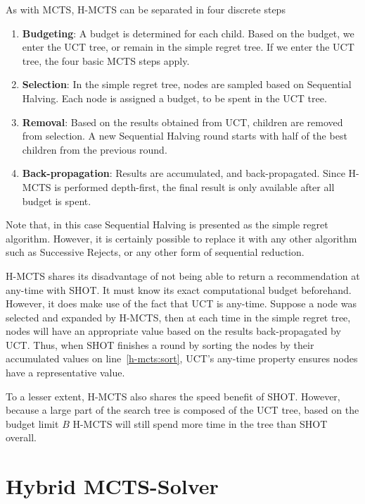 \documentclass{kecsmstr}
\begin{document}
As with MCTS, H-MCTS can be separated in four discrete steps
\begin{enumerate}
\item \textbf{Budgeting}: A budget is determined for each child. Based on the budget, we enter the UCT tree, or remain in the simple regret tree. If we enter the UCT tree, the four basic MCTS steps apply.
\item \textbf{Selection}: In the simple regret tree, nodes are sampled based on Sequential Halving. Each node is assigned a budget, to be spent in the UCT tree.
\item \textbf{Removal}: Based on the results obtained from UCT, children are removed from selection. A new Sequential Halving round starts with half of the best children from the previous round.
\item \textbf{Back-propagation}: Results are accumulated, and back-propagated. Since H-MCTS is performed depth-first, the final result is only available after all budget is spent.
\end{enumerate}
Note that, in this case Sequential Halving is presented as the simple regret algorithm. However, it is certainly possible to replace it with any other algorithm such as Successive Rejects, or any other form of sequential reduction.

H-MCTS shares its disadvantage of not being able to return a recommendation at any-time with SHOT. It must know its exact computational budget beforehand. However, it does make use of the fact that UCT is any-time. Suppose a node was selected and expanded by H-MCTS, then at each time in the simple regret tree, nodes will have an appropriate value based on the results back-propagated by UCT. Thus, when SHOT finishes a round by sorting the nodes by their accumulated values on line~\ref{h-mcts:sort}, UCT's any-time property ensures nodes have a representative value.

To a lesser extent, H-MCTS also shares the speed benefit of SHOT. However, because a large part of the search tree is composed of the UCT tree, based on the budget limit $B$ H-MCTS will still spend more time in the tree than SHOT overall.

\section{Hybrid MCTS-Solver}
\label{sec:hybmctssolver}
\end{document}
